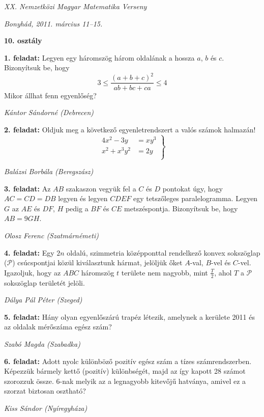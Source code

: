 \documentclass[a4paper,10pt]{article}
\newcommand{\ki}[2]{\hfill {\it #1 (#2)}\medskip}
\begin{document}
\begin{center} \Large {\em XX. Nemzetközi Magyar Matematika Verseny} \end{center}
\begin{center} \large{\em Bonyhád, 2011. március 11--15.} \end{center}
\smallskip
\begin{center} \large{\bf 10. osztály} \end{center}
\bigskip 

{\bf 1. feladat: }
Legyen egy háromszög három oldalának a hossza $a$, $b$ és $c$. Bizonyítsuk be, hogy
\[3 \le \frac{(a+b+c)^2}{ab+bc+ca} \le 4\]
Mikor állhat fenn egyenlőség?

\ki{Kántor Sándorné}{Debrecen}\medskip

{\bf 2. feladat: } 
Oldjuk meg a következő egyenletrendszert a valós számok halmazán!
\begin{equation*}
\left.
\begin{aligned}
4x^2-3y&= xy^3 \\
x^2+x^3y^2&= 2y \\
\end{aligned}
\right\}
\end{equation*}

\ki{Balázsi Borbála}{Beregszász}\medskip

{\bf 3. feladat: } 
Az $AB$ szakaszon vegyük fel a $C$ és $D$ pontokat úgy, hogy $AC=CD=DB$ legyen és legyen $CDEF$ egy tetszőleges  paralelogramma. Legyen $G$ az $AE$ és $DF$, $H$ pedig a $BF$ és $CE$ metszéspontja. Bizonyítsuk be, hogy $AB=9GH$.

\ki{Olosz Ferenc}{Szatmárnémeti}\medskip

{\bf 4. feladat: } 
Egy $2n$ oldalú, szimmetria középponttal rendelkező konvex sokszöglap ($\mathcal{P}$) csúcspontjai közül kiválasztunk hármat, jelöljük őket $A$-val, $B$-vel és $C$-vel. Igazoljuk, hogy az $ABC$ háromszög $t$ területe nem nagyobb, mint  $\frac{T}{2}$, ahol $T$ a $\mathcal{P}$ sokszöglap területét jelöli.

\ki{Dálya Pál Péter}{Szeged}\medskip

{\bf 5. feladat: } 
Hány olyan egyenlőszárú trapéz létezik, amelynek a kerülete 2011 és az oldalak mérőszáma egész szám?

\ki{Szabó Magda}{Szabadka}\medskip

{\bf 6. feladat: } 
Adott nyolc különböző pozitív egész szám a tízes számrendszerben. Képezzük bármely kettő (pozitív) különbségét, majd az így kapott 28 számot szorozzuk össze. 6-nak melyik az a legnagyobb kitevőjű hatványa, amivel ez a szorzat biztosan osztható?

\ki{Kiss Sándor}{Nyíregyháza}
\end{document}
